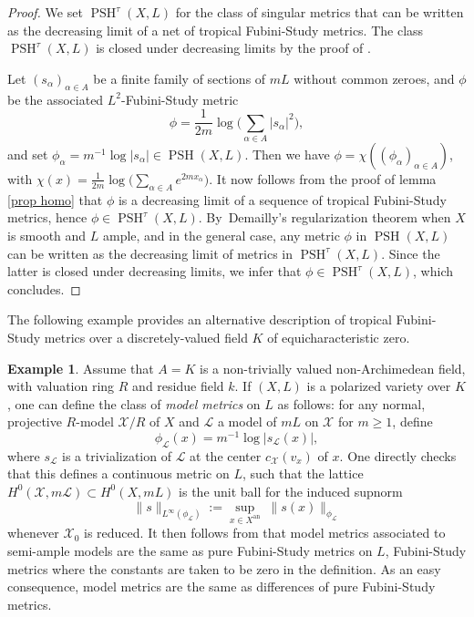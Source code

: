 \documentclass[JEP,XML,SOM,Unicode,published]{cedram}
\let\ts\textstyle
\theoremstyle{definition}
\newtheorem{ex}[equation]{Example}
\newcommand \Ld {\mathscr {L}}
\newcommand \X {\mathscr{X}}
\newcommand{\an}{\mathrm{an}}
\DeclareMathOperator{\PSH}{PSH}
\begin{document}
\begin{proof}
We set $\PSH^{\tau}(X, L)$ for the class of singular metrics that can be written as the decreasing limit of a net of tropical Fubini-Study metrics. The class $\PSH^{\tau}(X, L)$ is closed under decreasing limits by the proof of \cite[Prop.\,5.6]{BJtriv}.

Let $(s_{\alpha})_{\alpha \in A}$ be a finite family of sections of $mL$ without common zeroes, and $\phi$ be the associated $L^2$-Fubini-Study metric
\[
\phi = \frac{1}{2m}\ts \log\bigl(\sum_{\alpha \in A} \lvert s_{\alpha} \rvert^2\bigr),
\]
and set $\phi_{\alpha} = m^{-1} \log \lvert s_{\alpha} \rvert \in \PSH(X, L)$. Then we have $\phi = \chi((\phi_{\alpha})_{\alpha \in A})$, with $\chi(x) = \frac{1}{2m} \log\bigl(\sum_{\alpha \in A} e^{2mx_{\alpha}}\bigr)$. It now follows from the proof of lemma \ref{prop homo} that $\phi$ is a decreasing limit of a sequence of tropical Fubini-Study metrics, hence $\phi \in \PSH^{\tau}(X,L)$. By~Demailly's regularization theorem when $X$ is smooth and $L$ ample, and \cite[Th.\,7.1]{BE} in the general case, any metric $\phi$ in $\PSH(X,L)$ can be written as the decreasing limit of metrics in $\PSH^{\tau}(X, L)$. Since the latter is closed under decreasing limits, we infer that $\phi \in \PSH^{\tau}(X, L)$, which concludes.
\end{proof}
The following example provides an alternative description of tropical Fubini-Study metrics over a discretely-valued field $K$ of equicharacteristic zero.
\begin{ex} \label{ex model}
Assume that $A =K$ is a non-trivially valued non-Archimedean field, with valuation ring $R$ and residue field $k$. If $(X,L)$ is a polarized variety over $K$, one can define the class of \emph{model metrics} on $L$ as follows: for any normal, projective $R$-model $\X/R$ of $X$ and $\Ld$ a model of $mL$ on $\X$ for $m \ge 1$, define\vspace*{-3pt}
\[
\phi_{\Ld}(x) = m^{-1} \log \lvert s_{\Ld}(x) \rvert,
\]
where $s_{\Ld}$ is a trivialization of $\Ld$ at the center $c_{\X}(v_x)$ of $x$. One directly checks that this defines a continuous metric on $L$, such that the lattice $H^0(\X, m\Ld) \subset H^0(X, mL)$ is the unit ball for the induced supnorm\vspace*{-3pt}
\[
\lVert s \rVert_{L^\infty(\phi_{\Ld})}:= \sup_{x \in X^{\an}} \; \lVert s (x) \rVert_{\phi_{\Ld}}
\]whenever $\X_0$ is reduced.
It then follows from \cite[Th.\,5.14]{BE} that model metrics associated to semi-ample models are the same as pure Fubini-Study metrics on $L$, \ie Fubini-Study metrics where the constants are taken to be zero in the definition. As an easy consequence, model metrics are the same as differences of pure Fubini-Study metrics.
\end{ex}
\end{document}
